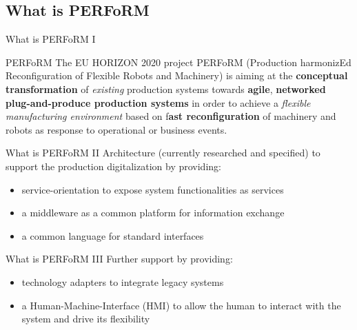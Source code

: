 \documentclass[12pt]{beamer}
\begin{document}
\subsection{What is PERFoRM}
\begin{frame}{What is PERFoRM I}
	\begin{exampleblock}{PERFoRM}
		The EU HORIZON 2020 project PERFoRM (Production harmonizEd Reconfiguration of Flexible Robots and Machinery) is aiming at the \textbf{conceptual transformation} of \emph{existing} production systems towards \textbf{agile}, \textbf{networked plug-and-produce production systems} in order to achieve a \emph{flexible manufacturing environment} based on f\textbf{ast reconfiguration} of machinery and robots as response to operational or business events.
	\end{exampleblock}
\end{frame}

\begin{frame}{What is PERFoRM II}
	Architecture (currently researched and specified) to support the production digitalization by providing:
	\newline 
	\begin{itemize}
		\item service-orientation to expose system functionalities as services
		\newline
		
		\item a middleware as a common platform for information exchange
		\newline
		
		\item a common language for standard interfaces
		\newline  
	\end{itemize}
\end{frame}

\begin{frame}{What is PERFoRM III}
	Further support by providing:
	\newline
	\begin{itemize}
		\item technology adapters to integrate legacy systems
		\newline
		
		\item a Human-Machine-Interface (HMI) to allow the human to interact with the system and drive its flexibility
	\end{itemize}
\end{frame}
\end{document}
